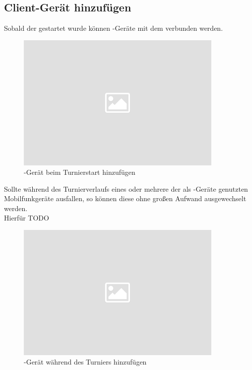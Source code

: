 \subsection{Client-Gerät hinzufügen}

\noindent
Sobald der \bb \ser gestartet wurde können \cli-Geräte mit dem \ser verbunden werden.\\[.1cm]

\noindent
\begin{figure}[ht]
	\centering
  \includegraphics[width=10cm]{pictures/placeholder.png}
	\caption{\cli-Gerät beim Turnierstart hinzufügen}
	\label{pic/cli_add_start}
\end{figure}

\noindent
Sollte während des Turnierverlaufs eines oder mehrere der als \cli-Geräte genutzten Mobilfunkgeräte ausfallen, so können diese ohne großen Aufwand ausgewechselt werden.\\[.05cm]
Hierfür TODO \\[.1cm]

\noindent
\begin{figure}[ht]
	\centering
  \includegraphics[width=10cm]{pictures/placeholder.png}
	\caption{\cli-Gerät während des Turniers hinzufügen}
	\label{pic/cli_add_mid}
\end{figure}

